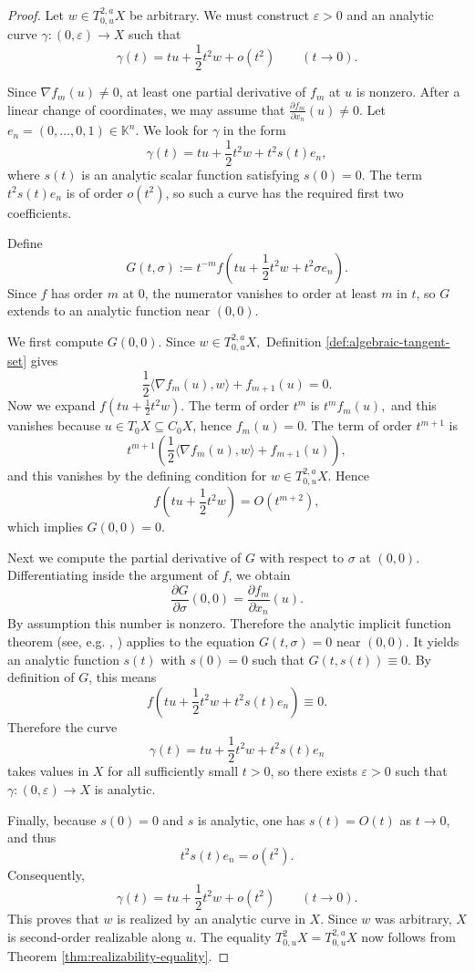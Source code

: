 \documentclass[10pt,reqno]{amsart}
\theoremstyle{break-italic}
\theoremstyle{break-italic}
\theoremstyle{break-italic}
\theoremstyle{break-italic}
\theoremstyle{break-italic}
\theoremstyle{break-italic}
\theoremstyle{break-italic}
\theoremstyle{break-italic}
\theoremstyle{break-roman}
\theoremstyle{standard}
\theoremstyle{varthm-roman}
\theoremstyle{varthm-italic}
\theoremstyle{varthm-roman-break}
\theoremstyle{varthm-italic-break}
\theoremstyle{varthm-roman-no-punctuation}
\theoremstyle{varthm-italic-no-punctuation}
\numberwithin{equation}{section}
\begin{document}
\begin{proof}
Let $w\in T^{2,a}_{0,u}X$ be arbitrary. We must construct $\varepsilon>0$ and an
analytic curve
\(
\gamma:(0,\varepsilon)\to X
\)
such that
\[
\gamma(t)=tu+\frac12 t^2w+o(t^2)
\qquad (t\to 0).
\]

Since $\nabla f_m(u)\neq 0$, at least one partial derivative of $f_m$ at $u$ is
nonzero. After a linear change of coordinates, we may assume that
\(
\frac{\partial f_m}{\partial x_n}(u)\ne 0.
\)
Let $e_n=(0,\dots,0,1)\in\mathbb K^n$. We look for $\gamma$ in the form
\[
\gamma(t)=tu+\frac12 t^2w+t^2 s(t)e_n,
\]
where $s(t)$ is an analytic scalar function satisfying $s(0)=0$. The term
$t^2s(t)e_n$ is of order $o(t^2)$, so such a curve has the required first two
coefficients.

Define
\[
G(t,\sigma)
:=
t^{-m}f\!\left(tu+\frac12 t^2w+t^2\sigma e_n\right).
\]
Since $f$ has order $m$ at $0$, the numerator vanishes to order at least $m$ in
$t$, so $G$ extends to an analytic function near $(0,0)$.

We first compute $G(0,0)$. Since
\(
w\in T^{2,a}_{0,u}X,
\)
Definition \ref{def:algebraic-tangent-set} gives
\[
\frac12\langle \nabla f_m(u),w\rangle + f_{m+1}(u)=0.
\]
Now we expand
\(
f\!\left(tu+\frac12 t^2w\right).
\)
The term of order $t^m$ is 
\(
t^m f_m(u),
\)
and this vanishes because $u\in T_0X\subseteq C_0X$, hence $f_m(u)=0$. The term of
order $t^{m+1}$ is
\[
t^{m+1}\left(\frac12\langle \nabla f_m(u),w\rangle + f_{m+1}(u)\right),
\]
and this vanishes by the defining condition for $w\in T^{2,a}_{0,u}X$. Hence
\[
f\!\left(tu+\frac12 t^2w\right)=O(t^{m+2}),
\]
which implies
\(
G(0,0)=0.
\)

Next we compute the partial derivative of $G$ with respect to $\sigma$ at
$(0,0)$. Differentiating inside the argument of $f$, we obtain
\[
\frac{\partial G}{\partial \sigma}(0,0)
=
\frac{\partial f_m}{\partial x_n}(u).
\]
By assumption this number is nonzero. Therefore the analytic implicit function
theorem (see, e.g. \cite[Theorem~2.3.5]{KrPa02}, \cite[Theorem~1.3.5 and Remarks~1.3.6, 1.3.10]{Nara85}) applies to the equation
\(
G(t,\sigma)=0
\)
near $(0,0)$. It yields an analytic function $s(t)$ with $s(0)=0$ such that
\(
G(t,s(t))\equiv 0.
\)
By definition of $G$, this means
\[
f\!\left(tu+\frac12 t^2w+t^2 s(t)e_n\right)\equiv 0.
\]
Therefore the curve
\[
\gamma(t)=tu+\frac12 t^2w+t^2 s(t)e_n
\]
takes values in $X$ for all sufficiently small $t>0$, so there exists
$\varepsilon>0$ such that
\(
\gamma:(0,\varepsilon)\to X
\)
is analytic.

Finally, because $s(0)=0$ and $s$ is analytic, one has $s(t)=O(t)$ as
$t\to 0$, and thus
\[
t^2s(t)e_n=o(t^2).
\]
Consequently,
\[
\gamma(t)=tu+\frac12 t^2w+o(t^2)
\qquad (t\to 0).
\]
This proves that $w$ is realized by an analytic curve in $X$. Since $w$ was
arbitrary, $X$ is second-order realizable along $u$. The equality
\(
T^2_{0,u}X=T^{2,a}_{0,u}X
\)
now follows from Theorem \ref{thm:realizability-equality}.
\end{proof}
\end{document}
